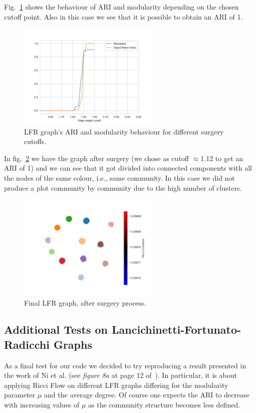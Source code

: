 Fig.~\ref{fig:LFR_Accuracy} shows the behaviour of ARI and modularity depending on the chosen cutoff point. Also in this case we see that it is possible to obtain an ARI of 1.
\begin{figure}
    \centering
    \includegraphics[width=0.6\textwidth]{../tests/ToyModelResults/LFR/Surgery Accuracy.png}
    \caption{LFR graph's ARI and modularity behaviour for different surgery cutoffs.}
    \label{fig:LFR_Accuracy}
\end{figure}

In fig.~\ref{fig:LFR_Surgery} we have the graph after surgery (we chose as cutoff $\approx$1.12 to get an ARI of 1) and we can see that it got divided into connected components with all the nodes of the same colour, i.e., same community. In this case we did not produce a plot community by community due to the high number of clusters. 
\begin{figure}
    \centering
    \includegraphics[width=0.6\textwidth]{../tests/ToyModelResults/LFR/After Surgery.png}
        \caption{Final LFR graph, after surgery process.}
        \label{fig:LFR_Surgery}
\end{figure}

\subsection{Additional Tests on Lancichinetti-Fortunato-Radicchi Graphs}
As a final test for our code we decided to try reproducing a result presented in the work of Ni et al. (see \textit{figure 8a} at page 12 of~\cite{Ni:communitydetectionnetworksricci}). In particular, it is about applying Ricci Flow on different LFR graphs differing for the modularity parameter $\mu$ and the average degree. Of course one expects the ARI to decrease with increasing values of $\mu$ as the community structure becomes less defined.

